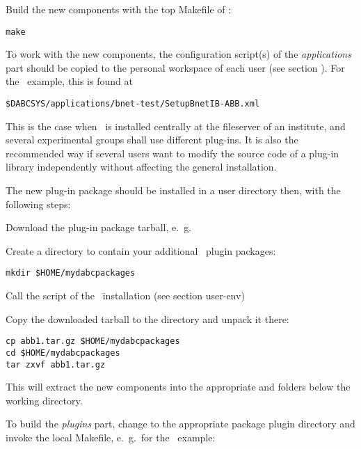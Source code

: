 \item Build the new components with the top Makefile of :
\begin{verbatim}
make
\end{verbatim} 

\item To work with the new components, the configuration script(s) of the {\em applications} part should be copied
to the personal workspace of each user (see section ).
For the \ABB\ example, this is found at
\begin{verbatim}
$DABCSYS/applications/bnet-test/SetupBnetIB-ABB.xml
\end{verbatim} 
\enum





This is the case when \dabc\ is installed centrally at the fileserver
of an institute, and several experimental groups shall use different plug-ins.
It is also the recommended way if several users 
want to modify the source code of a plug-in library independently without 
affecting the general installation.


The new plug-in package should be installed in a user directory
then, with the following steps:

\bnum
\item Download the plug-in package tarball, e.~g.\ 

\item Create a directory to contain your additional \dabc\ plugin packages:
\begin{verbatim}
mkdir $HOME/mydabcpackages
\end{verbatim} 

\item Call the  script of the \dabc\ installation (see section user-env)

\item Copy the downloaded tarball to the  directory and unpack it there:
\begin{verbatim}
cp abb1.tar.gz $HOME/mydabcpackages
cd $HOME/mydabcpackages
tar zxvf abb1.tar.gz
\end{verbatim} 
This will extract the new components into the appropriate  and
 folders below the working directory. 

\item To build the {\em plugins} part, change to the appropriate package plugin
directory and invoke the local Makefile, e.~g.\ for the \ABB\ example:

